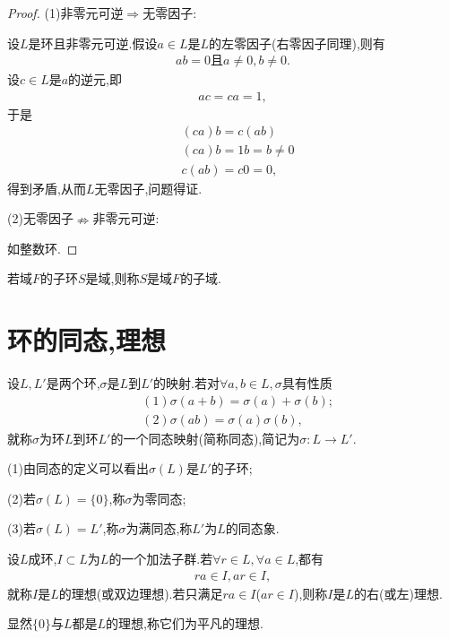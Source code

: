 \begin{proof}
    (1)非零元可逆$\Rightarrow$无零因子:

    设$L$是环且非零元可逆.假设$a\in L$是$L$的左零因子(右零因子同理),则有\begin{align*}
        ab=0\text{且}a\neq0,b\neq0.
    \end{align*}设$c\in L$是$a$的逆元,即\begin{align*}
        ac=ca=1,
    \end{align*}于是\begin{align*}
        &(ca)b=c(ab)\\
        &(ca)b=1b=b\neq0\\
        &c(ab)=c0=0,
    \end{align*}得到矛盾,从而$L$无零因子,问题得证.

    (2)无零因子$\nRightarrow$非零元可逆:

    如整数环.
\end{proof}
\begin{definition}[子域]
    若域$F$的子环$S$是域,则称$S$是域$F$的子域.
\end{definition}
\section{环的同态,理想}
\begin{definition}[同态]
    设$L,L'$是两个环,$\sigma$是$L$到$L'$的映射.若对$\forall a,b\in L,\sigma$具有性质\begin{align*}
        &(1)\sigma(a+b)=\sigma(a)+\sigma(b);\\
        &(2)\sigma(ab)=\sigma(a)\sigma(b),
    \end{align*}就称$\sigma$为环$L$到环$L'$的一个同态映射(简称同态),简记为$\sigma:L\to L'$.
\end{definition}
\begin{remark}
    (1)由同态的定义可以看出$\sigma(L)$是$L'$的子环;

    (2)若$\sigma(L)=\{0\}$,称$\sigma$为零同态;

    (3)若$\sigma(L)=L'$,称$\sigma$为满同态,称$L'$为$L$的同态象.
\end{remark}
\begin{definition}[理想]
    设$L$成环,$I\subset L$为$L$的一个加法子群.若$\forall r\in L,\forall a\in L$,都有\begin{align*}
        ra\in I,ar\in I,
    \end{align*}就称$I$是$L$的理想(或双边理想).若只满足$ra\in I$($ar\in I$),则称$I$是$L$的右(或左)理想.
\end{definition}
\begin{remark}
    显然$\{0\}$与$L$都是$L$的理想,称它们为平凡的理想.
\end{remark}
